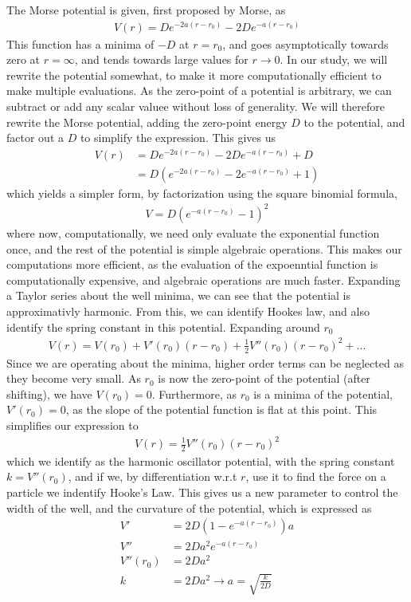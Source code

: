 \documentclass{subfiles}
\begin{document}
The Morse potential is given, first proposed by Morse, as
\begin{align*}
    V(r) = De^{-2a(r-r_0)} - 2De^{-a(r-r_0)}
\end{align*}
This function has a minima of $-D$ at $r = r_0$, and goes asymptotically towards zero at $r=\infty$, and tends towards large values for $r\rightarrow0$. In our study, we will rewrite the potential somewhat, to make it more computationally efficient to make multiple evaluations. As the zero-point of a potential is arbitrary, we can subtract or add any scalar valuee without loss of generality. We will therefore rewrite the Morse potential, adding the zero-point energy $D$ to the potential, and factor out a $D$ to simplify the expression. This gives us
\begin{align*}
    V(r) &= De^{-2a(r-r_0)} - 2De^{-a(r-r_0)} + D \\
    &= D(e^{-2a(r-r_0)} - 2e^{-a(r-r_0)} + 1)
\end{align*}
which yields a simpler form, by factorization using the square binomial formula,
\begin{align}
    V = D(e^{-a(r-r_0)} - 1)^2\label{eq:morse_potential}
\end{align}
where now, computationally, we need only evaluate the exponential function once, and the rest of the potential is simple algebraic operations. This makes our computations more efficient, as the evaluation of the expoenntial function is computationally expensive\cite{sauce?}, and algebraic operations are much faster. Expanding a Taylor series about the well minima, we can see that the potential is approximativly harmonic. From this, we can identify Hookes law, and also identify the spring constant in this potential. Expanding around $r_0$
\begin{align*}
    V(r) = V(r_0) + V'(r_0)(r-r_0) + \frac{1}{2}V''(r_0)(r-r_0)^2 + ...
\end{align*}
Since we are operating about the minima, higher order terms can be neglected as they become very small. As $r_0$ is now the zero-point of the potential (after shifting), we have $V(r_0) = 0$. Furthermore, as $r_0$ is a minima of the potential, $V'(r_0) = 0$, as the slope of the potential function is flat at this point. This simplifies our expression to
\begin{align*}
    V(r) = \frac{1}{2}V''(r_0)(r-r_0)^2
\end{align*}
which we identify as the harmonic oscillator potential, with the spring constant $k = V''(r_0)$, and if we, by differentiation w.r.t $r$, use it to find the force on a particle we indentify Hooke's Law. This gives us a new parameter to control the width of the well, and the curvature of the potential, which is expressed as
\begin{align*}
    V' &= 2D(1 - e^{-a(r-r_0)})a \\
    V'' &= 2Da^2e^{-a(r-r_0)} \\
    V''(r_0) &= 2Da^2 \\
    k &= 2Da^2 \rightarrow a = \sqrt{\frac{k}{2D}}
\end{align*} 
\end{document}
